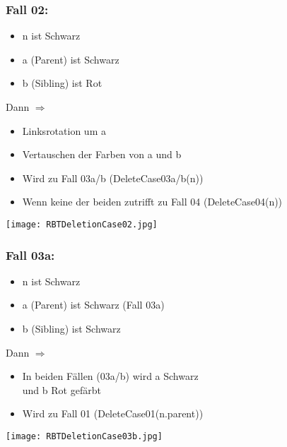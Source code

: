 		\subsubsection{Fall 02:}
			\begin{minipage}{0.5\textwidth}
				\begin{itemize}
					\item n ist Schwarz
					\item a (Parent) ist Schwarz
					\item b (Sibling) ist Rot \\
				\end{itemize}

				Dann $\Rightarrow$
				\begin{itemize}
					\item Linksrotation um a
					\item Vertauschen der Farben von a und b
					\item Wird zu Fall 03a/b (DeleteCase03a/b(n))
					\item Wenn keine der beiden zutrifft zu Fall 04 (DeleteCase04(n))
				\end{itemize}
			\end{minipage}
			\begin{minipage}{0.45\textwidth}
				\texttt{[image: RBTDeletionCase02.jpg]}
			\end{minipage}
			\vspace{0.9cm}

		\centerline{\noindent\makebox[0.5\linewidth]{\rule{0.5\paperwidth}{0.4pt}}}
		\subsubsection{Fall 03a:}
			\begin{minipage}[t]{0.5\textwidth}
				\vspace{0.1cm}
				\begin{itemize}
					\item n ist Schwarz
					\item a (Parent) ist Schwarz (Fall 03a)
					\item b (Sibling) ist  Schwarz \\
				\end{itemize}
	
				Dann $\Rightarrow$
				\begin{itemize}
					\item In beiden Fällen (03a/b) wird a Schwarz \\
						und b Rot gefärbt
					\item Wird zu Fall 01 (DeleteCase01(n.parent))
				\end{itemize}
			\end{minipage}
			\begin{minipage}[t]{0.45\textwidth}
				\begin{center}
					\texttt{[image: RBTDeletionCase03b.jpg]}
				\end{center}
			\end{minipage}
			\vspace{0.9cm}
				
